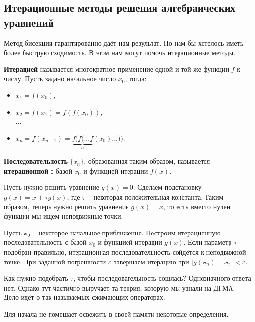 \documentclass[main.tex]{subfile}
\begin{document}
\subsection{Итерационные методы решения алгебраических уравнений}

Метод бисекции гарантированно даёт нам результат. Но нам бы хотелось иметь
более быструю сходимость. В этом нам могут помочь итерационные методы.

\begin{define}
	\textbf{Итерацией} называется многократное применение одной и той же
	функции $f$ к числу. Пусть задано начальное число $x_0$, тогда:
	\begin{itemize}
		\item $x_1=f(x_0)$,
		\item $x_2=f(x_1)=f(f(x_0))$,\\
		...
		\item $x_n=f(x_{n-1})=\underset{n}{\underbrace{f(f(...f}}(x_0)...))$.
	\end{itemize}

	\textbf{Последовательность} $\{x_n\}$, образованная таким образом,
	называется \textbf{итерационной} с базой $x_0$ и функцией итерации $f(x)$.
\end{define}

\begin{algorithm}
	Пусть нужно решить уравнение $y(x)=0$. Сделаем подстановку
	$g(x)=x+\tau y(x)$, где $\tau$ -- некоторая положительная константа.
	Таким образом, теперь нужно решить уравнение $g(x)=x$, то есть вместо
	нулей функции мы ищем неподвижные точки.

	Пусть $x_0$ -- некоторое начальное приближение. Построим итерационную
	последовательность с базой $x_0$ и функцией итерации $g(x)$. Если
	параметр $\tau$ подобран правильно, итерационная последовательность
	сойдётся к неподвижной точке. При заданной погрешности $\varepsilon$
	завершаем итерацию при $|g(x_n)-x_n|<\varepsilon$.
\end{algorithm}

Как нужно подобрать $\tau$, чтобы последовательность сошлась? Однозначного ответа
нет. Однако тут частично выручает та теория, которую мы узнали на ДГМА. Дело
идёт о так называемых сжимающих операторах.

Для начала не помешает освежить в своей памяти некоторые определения.
\end{document}
